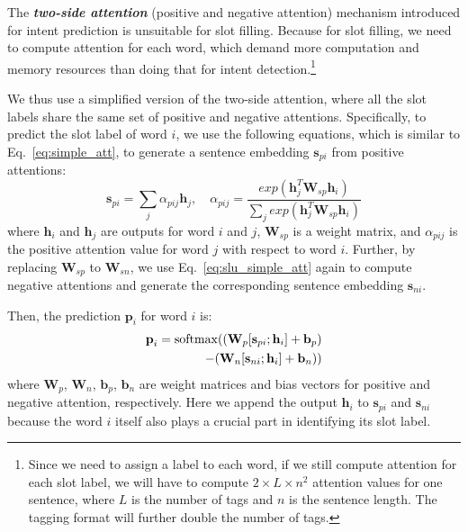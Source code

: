 The \textbf{\emph{two-side attention}} (positive and negative attention) mechanism introduced for intent prediction is unsuitable for slot
filling. Because for slot filling, we need to compute attention for each word, which demand more computation
and memory resources than doing that for intent detection.\footnote{Since we need to assign a label to each word, if we still compute
attention for each slot label, we will have to compute $2\times L \times n^2$ attention values for one sentence, where $L$ is the number of
tags and $n$ is the sentence length. The \BIO tagging format will further double the number of tags.}

We thus use a simplified version of the two-side attention, where all the slot labels share the same set of positive and negative attentions.
Specifically, to predict the slot label of word $i$, we use the following equations, which is similar to Eq.~\ref{eq:simple_att}, to generate a sentence embedding $\textbf{s}_{pi}$ from positive attentions: 
\begin{equation}
\textbf{s}_{pi} = \sum_{j}{\alpha_{pij}\textbf{h}_j}, \quad \alpha_{pij}=\frac{exp(\textbf{h}_j^T\textbf{W}_{sp}\textbf{h}_i)}{\sum_{j}{exp(\textbf{h}_j^T\textbf{W}_{sp}\textbf{h}_i)}}
\label{eq:slu_simple_att}
\end{equation}
where $\textbf{h}_i$ and $\textbf{h}_j$ are \BLSTM outputs for word $i$ and $j$, $\textbf{W}_{sp}$ is a weight matrix, and $\alpha_{pij}$ is the positive attention value for word $j$ with respect to word $i$.
Further, by replacing $\textbf{W}_{sp}$ to $\textbf{W}_{sn}$, we use  Eq.~\ref{eq:slu_simple_att} again to compute negative attentions and generate the corresponding sentence embedding $\textbf{s}_{ni}$.

Then, the prediction $\textbf{p}_i$ for word $i$ is:
\begin{equation}
\begin{split}
\textbf{p}_i = \operatorname{softmax}((\textbf{W}_p [\textbf{s}_{pi}; \textbf{h}_i] + \textbf{b}_p) \\- (\textbf{W}_n [\textbf{s}_{ni}; \textbf{h}_i] + \textbf{b}_n))
\end{split}
\end{equation}
where $\textbf{W}_{p}$, $\textbf{W}_{n}$, $\textbf{b}_{p}$, $\textbf{b}_{n}$ are weight matrices and bias vectors for positive and negative attention, respectively. Here we append the \BLSTM output $\textbf{h}_i$ to $\textbf{s}_{pi}$ and $\textbf{s}_{ni}$ because the word $i$ itself also plays a crucial part in identifying its slot label.


